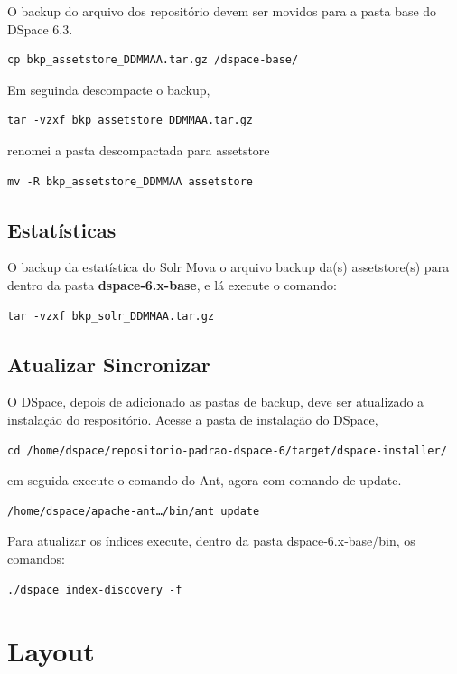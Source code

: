\documentclass[12pt,hidelinks]{article}
\begin{document}
O backup do arquivo dos repositório devem ser movidos para a pasta base do DSpace 6.3.
\begin{verbatim}
cp bkp_assetstore_DDMMAA.tar.gz /dspace-base/
\end{verbatim}
Em seguinda descompacte o backup,
\begin{verbatim}
tar -vzxf bkp_assetstore_DDMMAA.tar.gz
\end{verbatim}
renomei a pasta descompactada para assetstore
\begin{verbatim}
mv -R bkp_assetstore_DDMMAA assetstore 
\end{verbatim}


\subsection{Estatísticas}

O backup da estatística do Solr
\textbullet \hspace{6pt} Mova o arquivo backup da(s) assetstore(s) para dentro da pasta \textbf{dspace-6.x-base}, e lá execute o comando:

\begin{verbatim}
tar -vzxf bkp_solr_DDMMAA.tar.gz
\end{verbatim}

\subsection{Atualizar Sincronizar}

O DSpace, depois de adicionado as pastas de backup, deve ser atualizado a instalação do respositório. Acesse a pasta de instalação do DSpace,
\begin{verbatim}
cd /home/dspace/repositorio-padrao-dspace-6/target/dspace-installer/
\end{verbatim}
em seguida execute o comando do Ant, agora com comando de update.
\begin{verbatim}
/home/dspace/apache-ant…/bin/ant update
\end{verbatim}

Para atualizar os índices execute, dentro da pasta dspace-6.x-base/bin, os comandos:
\begin{verbatim}
./dspace index-discovery -f
\end{verbatim}

\newpage
\section{Layout}
\newpage
\end{document}

